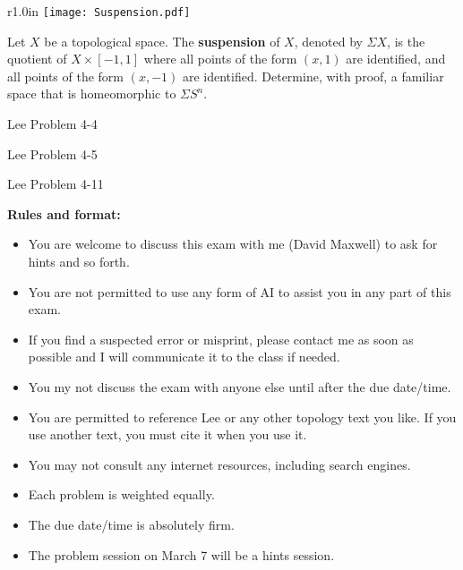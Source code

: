 \documentclass{homework651}
\begin{document}
\begin{problems}
\begin{wrapfigure}{r}{1.0in}
    \vskip-0.5cm
    \texttt{[image: Suspension.pdf]}
    \end{wrapfigure}
    \problem
    Let $X$ be a topological space.  The {\bf suspension} of $X$, denoted by
    $\Sigma X$, is the quotient of $X\times [-1,1]$ where all points of the form $(x,1)$
    are identified, and all points of the form $(x,-1)$ are identified.  
    Determine, with proof, a familiar space that is homeomorphic to $\Sigma S^n$.
    
\problem Lee Problem 4-4

\problem Lee Problem 4-5

\problem Lee Problem 4-11

\newpage
{\bf  Rules and format:}
\begin{itemize}

\item You are welcome to discuss this exam with me (David Maxwell) to ask for hints and so forth.
\item You are not permitted to use any form of AI to assist you in any part of this exam.
\item  If you find a suspected error or misprint, please contact me as soon as possible and I will
communicate it to the class if needed.
\item You my not discuss the exam with anyone else until after the due date/time.
\item You are permitted to reference Lee or any other topology text you like.  If you use
another text, you must cite it when you use it.
\item You may not consult any internet resources, including search engines.
\item Each problem is weighted equally.
\item The due date/time is absolutely firm.
\item The problem session on March 7 will be a hints session.
\end{itemize}

\end{problems}
\end{document}
